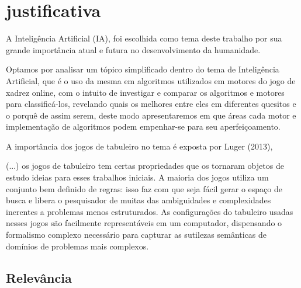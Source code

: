 \chapter{justificativa}

A Inteligência Artificial (IA), foi escolhida como tema deste trabalho por sua grande importância atual e futura no desenvolvimento da humanidade.

Optamos por analisar um tópico simplificado dentro do tema de Inteligência Artificial, que é o uso da mesma em algoritmos utilizados em motores do jogo de xadrez online, com o intuito de investigar e comparar os algoritmos e motores para classificá-los, revelando quais os melhores entre eles em diferentes quesitos e o porquê de assim serem, deste modo apresentaremos em que áreas cada motor e implementação de algoritmos podem empenhar-se para seu aperfeiçoamento.

A importância dos jogos de tabuleiro no tema é exposta por Luger (2013),
\begin{citacao}
    (...) os jogos de tabuleiro tem certas propriedades que os tornaram objetos de estudo ideias para esses trabalhos iniciais. A maioria dos jogos utiliza um conjunto bem definido de regras: isso faz com que seja fácil gerar o espaço de busca e libera o pesquisador de muitas das ambiguidades e complexidades inerentes a problemas menos estruturados. As configurações do tabuleiro usadas nesses jogos são facilmente representáveis em um computador, dispensando o formalismo complexo necessário para capturar as sutilezas semânticas de domínios de problemas mais complexos. \cite[p.17]{luger}
\end{citacao}

\section{Relevância}